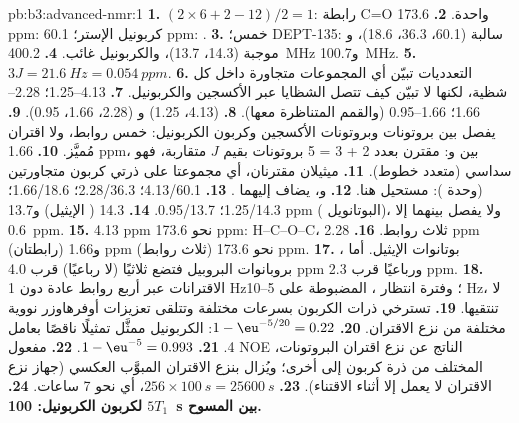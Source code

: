 \begin{solution}{pb:b3:advanced-nmr:1}
\textbf{1.} $(2 \times 6 + 2 - 12)/2 = 1$: رابطة C=O واحدة.
\textbf{2.} 173.6 ppm: كربونيل الإستر؛ 60.1 ppm: .
\textbf{3.} خمس؛ DEPT-135:  سالبة (60.1، 36.3، 18.6)، و موجبة (14.3،
13.7)، والكربونيل غائب.
\textbf{4.} \qty{400.2}{MHz} و\qty{100.7}{MHz}.
\textbf{5.} $3J = \qty{21.6}{Hz} = \qty{0.054}{ppm}$.
\textbf{6.} التعدديات تبيّن أي المجموعات متجاورة داخل كل
شظية، لكنها لا تبيّن كيف تتصل الشظايا عبر الأكسجين والكربونيل.
\textbf{7.} 4.13--1.25؛ 2.28--1.66؛ 1.66--0.95 (والقمم المتناظرة معها).
\textbf{8.}  (4.13، 1.25) و (2.28، 1.66، 0.95).
\textbf{9.} يفصل بين بروتونات  وبروتونات  الأكسجين 
وكربون الكربونيل: خمس روابط، ولا اقتران مُميَّز.
\textbf{10.} 1.66 ppm، بين  و: مقترن بعدد 2 + 3 = 5 بروتونات بقيم
$J$ متقاربة، فهو سداسي (متعدد خطوط).
\textbf{11.} ميثيلان مقترنان، أي مجموعتا  على ذرتي كربون متجاورتين (وحدة ): مستحيل هنا.
\textbf{12.}  و، يضاف إليهما .
\textbf{13.} 4.13/60.1؛ 2.28/36.3؛ 1.66/18.6؛ 1.25/14.3؛ 0.95/13.7.
\textbf{14.} 14.3 ( الإيثيل) و13.7 ppm ( البوتانويل)، ولا يفصل بينهما إلا \qty{0.6}{ppm}.
\textbf{15.} 4.13 ppm نحو 173.6 ppm: H--C--O--C، ثلاث روابط.
\textbf{16.} 2.28 ppm (رابطتان) و1.66 ppm (ثلاث روابط) نحو 173.6 ppm.
\textbf{17.} ، بوتانوات الإيثيل. أما بروبانوات البروبيل فتضع
ثلاثيًا  (لا رباعيًا) قرب 4.0 ppm ورباعيًا قرب 2.3 ppm.
\textbf{18.} الاقترانات عبر أربع روابط عادة دون 1 Hz؛ وفترة انتظار ، المضبوطة على
5--10 Hz، لا تنتقيها.
\textbf{19.} تسترخي ذرات الكربون بسرعات مختلفة وتتلقى تعزيزات أوفرهاوزر
نووية مختلفة من نزع الاقتران.
\textbf{20.} $1 - \eu^{-5/20} = 0.22$: الكربونيل ممثَّل تمثيلًا ناقصًا بعامل 4.
\textbf{21.} $1 - \eu^{-5} = 0.993$.
\textbf{22.} مفعول NOE الناتج عن نزع اقتران البروتونات، المختلف من ذرة كربون إلى أخرى؛ ويُزال
بنزع الاقتران المبوَّب العكسي (جهاز نزع الاقتران لا يعمل إلا أثناء الاقتناء).
\textbf{23.} $256 \times \qty{100}{s} = \qty{25600}{s}$، أي نحو 7 ساعات.
\textbf{24.} \textbf{$5T_1$ لكربون الكربونيل: \qty{100}{s} بين المسوح.}
\end{solution}
